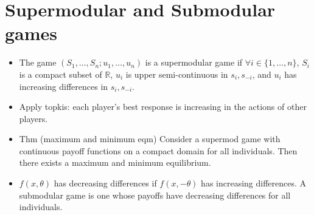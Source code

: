 \documentclass[11pt]{article} %
\begin{document}
\section{Supermodular and Submodular games}
\begin{itemize}
\item The game $(S_1,\dots,S_n;u_1,\dots,u_n)$ is a supermodular game if $\forall i \in \{1,\dots,n\}$, $S_i$ is a compact subset of $\mathbb{R}$, $u_i$ is upper semi-continuous in $s_i,s_{-i}$, and $u_i$ has increasing differences in $s_i,s_{-i}$.
\item Apply topkis: each player's best response is increasing in the actions of other players.
\item Thm (maximum and minimum eqm) Consider a supermod game with continuous payoff functions on a compact domain for all individuals. Then there exists a maximum and minimum equilibrium.
\item $f(x,\theta)$ has decreasing differences if $f(x,-\theta)$ has increasing differences. A submodular game is one whose payoffs have decreasing differences for all individuals.
\end{itemize}
\end{document}
